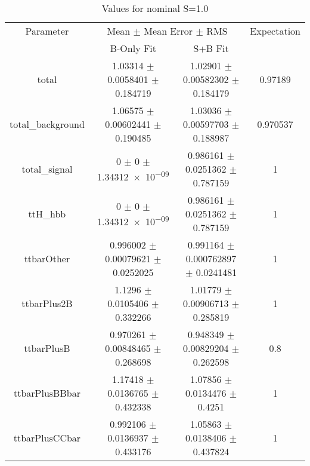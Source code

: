 \begin{table}
\centering
\caption{Values for nominal S=1.0}
\begin{tabular}{cccc}
\toprule
Parameter & \multicolumn{2}{c}{Mean $\pm$ Mean Error $\pm$ RMS} & Expectation\\
 & B-Only Fit & S+B Fit & \\
\midrule
total & \num{1.03314} $\pm$ \num{0.0058401} $\pm$ \num{0.184719} & \num{1.02901} $\pm$ \num{0.00582302} $\pm$ \num{0.184179} & \num{0.97189}\\
total\_background & \num{1.06575} $\pm$ \num{0.00602441} $\pm$ \num{0.190485} & \num{1.03036} $\pm$ \num{0.00597703} $\pm$ \num{0.188987} & \num{0.970537}\\
total\_signal & \num{0} $\pm$ \num{0} $\pm$ \num{1.34312e-09} & \num{0.986161} $\pm$ \num{0.0251362} $\pm$ \num{0.787159} & \num{1}\\
ttH\_hbb & \num{0} $\pm$ \num{0} $\pm$ \num{1.34312e-09} & \num{0.986161} $\pm$ \num{0.0251362} $\pm$ \num{0.787159} & \num{1}\\
ttbarOther & \num{0.996002} $\pm$ \num{0.00079621} $\pm$ \num{0.0252025} & \num{0.991164} $\pm$ \num{0.000762897} $\pm$ \num{0.0241481} & \num{1}\\
ttbarPlus2B & \num{1.1296} $\pm$ \num{0.0105406} $\pm$ \num{0.332266} & \num{1.01779} $\pm$ \num{0.00906713} $\pm$ \num{0.285819} & \num{1}\\
ttbarPlusB & \num{0.970261} $\pm$ \num{0.00848465} $\pm$ \num{0.268698} & \num{0.948349} $\pm$ \num{0.00829204} $\pm$ \num{0.262598} & \num{0.8}\\
ttbarPlusBBbar & \num{1.17418} $\pm$ \num{0.0136765} $\pm$ \num{0.432338} & \num{1.07856} $\pm$ \num{0.0134476} $\pm$ \num{0.4251} & \num{1}\\
ttbarPlusCCbar & \num{0.992106} $\pm$ \num{0.0136937} $\pm$ \num{0.433176} & \num{1.05863} $\pm$ \num{0.0138406} $\pm$ \num{0.437824} & \num{1}\\
\bottomrule
\end{tabular}
\end{table}